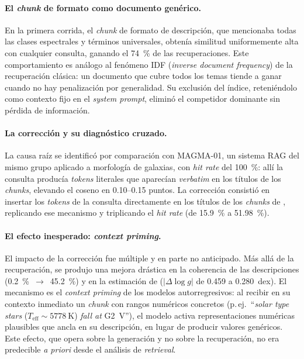 \paragraph{El \emph{chunk} de formato como documento genérico.} En la primera
corrida, el \emph{chunk} de formato de descripción, que mencionaba todas las
clases espectrales y términos universales, obtenía similitud uniformemente alta
con cualquier consulta, ganando el \SI{74}{\percent} de las recuperaciones. Este
comportamiento es análogo al fenómeno IDF (\emph{inverse document frequency}) de la
recuperación clásica: un documento que cubre todos los temas tiende a ganar cuando
no hay penalización por generalidad. Su exclusión del índice, reteniéndolo como
contexto fijo en el \emph{system prompt}, eliminó el competidor dominante sin
pérdida de información.

\paragraph{La corrección y su diagnóstico cruzado.} La causa raíz se identificó por
comparación con MAGMA-01, un sistema RAG del mismo grupo aplicado a morfología de
galaxias, con \emph{hit rate} del \SI{100}{\percent}: allí la consulta producía
\emph{tokens} literales que aparecían \emph{verbatim} en los títulos de los
\emph{chunks}, elevando el coseno en \numrange{0.10}{0.15} puntos. La corrección
consistió en insertar los \emph{tokens} de la consulta directamente en los títulos
de los \emph{chunks} de \STELLAR{}, replicando ese mecanismo y triplicando el
\emph{hit rate} (de \SI{15.9}{\percent} a \SI{51.98}{\percent}).

\paragraph{El efecto inesperado: \emph{context priming}.} El impacto de la
corrección fue múltiple y en parte no anticipado. Más allá de la recuperación, se
produjo una mejora drástica en la coherencia de las descripciones
(\SI{0.2}{\percent}~$\rightarrow$~\SI{45.2}{\percent}) y en la estimación de \logg{}
($|\Delta\log g|$ de \num{0.459} a \num{0.280}~dex). El mecanismo es el
\emph{context priming} de los modelos autorregresivos: al recibir en su contexto
inmediato un \emph{chunk} con rangos numéricos concretos (p.\,ej.\ ``\emph{solar
type stars} ($T_\mathrm{eff}\sim\SI{5778}{\kelvin}$) \emph{fall at} G2~V''), el
modelo activa representaciones numéricas plausibles que ancla en su descripción,
en lugar de producir valores genéricos. Este efecto, que opera sobre la generación
y no sobre la recuperación, no era predecible \emph{a priori} desde el análisis de
\emph{retrieval}.

